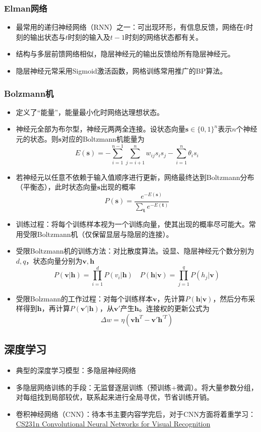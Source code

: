 \documentclass{ctexart}
\begin{document}
					\subsubsection{Elman网络}
						\begin{itemize}
							\item 最常用的递归神经网络（RNN）之一：可出现环形，有信息反馈，网络在$t$时刻的输出状态与$t$时刻的输入及$t-1$时刻的网络状态都有关。
							\item 结构与多层前馈网络相似，隐层神经元的输出反馈给所有隐层神经元。
							\item 隐层神经元常采用Sigmoid激活函数，网格训练常用推广的BP算法。
						\end{itemize}
					\subsubsection{Bolzmann机}
						\begin{itemize}
							\item 定义了``能量''，能量最小化时网络达理想状态。
							\item 神经元全部为布尔型，神经元两两全连接。设状态向量$\bm{s}\in\{0,1\}^n$表示$n$个神经元的状态。则$\bm{s}$对应的Boltzmann机能量为\[E(\bm{s})=-\sum_{i=1}^{n-1}\sum_{j=i+1}^{n}w_{ij}s_is_j-\sum_{i=1}^{n}\theta_is_i\]
							\item 若神经元以任意不依赖于输入值顺序进行更新，网络最终达到Boltzmann分布（平衡态），此时状态向量$\bm{s}$出现的概率\[P(\bm{s})=\frac{e^{-E(\bm{s})}}{\sum_{\bm{t}}^{}e^{-E(\bm{t})}}\]
							\item 训练过程：将每个训练样本视为一个训练向量，使其出现的概率尽可能大。常用受限Boltzmann机（仅保留显层与隐层的连接）。
							\item 受限Boltzmann机的训练方法：对比散度算法。设显、隐层神经元个数分别为$d,q$，状态向量分别为$\bm{v},\bm{h}$\[P(\bm{v}|\bm{h})=\prod_{i=1}^{d}P(v_i|\bm{h})\quad P(\bm{h}|\bm{v})=\prod_{j=1}^{q}P(h_j|\bm{v})\]
							\item 受限Bolzmann的工作过程：对每个训练样本$\bm{v}$，先计算$P(\bm{h}|\bm{v})$，然后分布采样得到$\bm{h}$，再计算$P(\bm{v}'|\bm{h})$，从$\bm{v}'$产生$\bm{h}$。连接权的更新公式为\[\Delta w=\eta(\bm{v}\bm{h}^T-\bm{v}'\bm{h}^{'T})\]
						\end{itemize}
				\subsection{深度学习}
					\begin{itemize}
						\item 典型的深度学习模型：多隐层神经网络
						\item 多隐层网络训练的手段：无监督逐层训练（预训练+微调）。将大量参数分组，对每组找到局部较优，联系起来进行全局寻优，节省训练开销。
						\item 卷积神经网络（CNN）：待本书主要内容学完后，对于CNN方面将着重学习：\href{https://cs231n.github.io}{CS231n Convolutional Neural Networks for Visual Recognition}
					\end{itemize}
\end{document}
